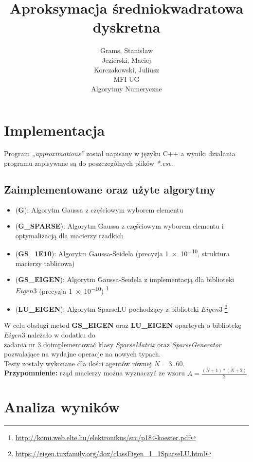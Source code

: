 \documentclass[10pt]{article}
\begin{document}
\title{Aproksymacja średniokwadratowa dyskretna}
\author{Grams, Stanisław\\Jezierski, Maciej\\Korczakowski, Juliusz\\ MFI UG\\Algorytmy Numeryczne}

\maketitle
\section {Implementacja}
Program \textit{„approximations”} został napisany w języku C++ a wyniki działania programu zapisywane są do poszczególnych plików \textit{*.csv}.
\subsection{Zaimplementowane oraz użyte algorytmy}
\begin{itemize}
	\item (\textbf{G}): Algorytm Gaussa z częściowym wyborem elementu
	\item (\textbf{G\_SPARSE}): Algorytm Gaussa z częściowym wyborem elementu i optymalizacją dla macierzy rzadkich 
	\item (\textbf{GS\_1E10}): Algorytm Gaussa-Seidela (precyzja \num{1e-10}, struktura macierzy tablicowa)
	\item (\textbf{GS\_EIGEN}): Algorytm Gaussa-Seidela z implementacją dla biblioteki $Eigen3$ (precyzja \num{1e-10})
	\footnote{\url{http://komi.web.elte.hu/elektronikus/src/p184-koester.pdf}}
	\item (\textbf{LU\_EIGEN}): Algorytm SparseLU pochodzący z biblioteki $Eigen3$
	\footnote{\url{https://eigen.tuxfamily.org/dox/classEigen_1_1SparseLU.html}}
\end{itemize}
W celu obsługi metod \textbf{GS\_EIGEN} oraz \textbf{LU\_EIGEN} oparteych o bibliotekę $Eigen3$ należało w dodatku do\\
zadania nr 3 doimplementować klasy \textit{SparseMatrix} oraz \textit{SparseGenerator} pozwalające na wydajne operacje na nowych typach.\\
Testy zostały wykonane dla ilości agentów równej $N = 3 .. 60$.\\
\textbf{Przypomnienie:} rząd macierzy można wyznaczyć ze wzoru $A = \frac{(N+1) * (N+2)}{2}$ 
\section{Analiza wyników}
\end{document}
